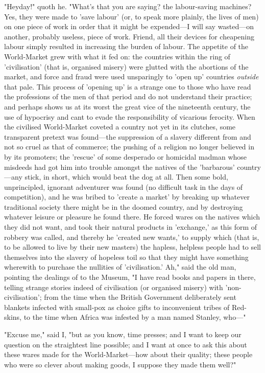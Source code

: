"Heyday!" quoth he. "What's that you are saying? the labour-saving
machines? Yes, they were made to 'save labour' (or, to speak more
plainly, the lives of men) on one piece of work in order that it might
be expended---I will say wasted---on another, probably useless, piece of
work. Friend, all their devices for cheapening labour simply resulted in
increasing the burden of labour. The appetite of the World-Market grew
with what it fed on: the countries within the ring of 'civilisation'
(that is, organised misery) were glutted with the abortions of the
market, and force and fraud were used unsparingly to 'open up' countries
\emph{outside} that pale. This process of 'opening up' is a strange one
to those who have read the professions of the men of that period and do
not understand their practice; and perhaps shows us at its worst the
great vice of the nineteenth century, the use of hypocrisy and cant to
evade the responsibility of vicarious ferocity. When the civilised
World-Market coveted a country not yet in its clutches, some transparent
pretext was found---the suppression of a slavery different from and not
so cruel as that of commerce; the pushing of a religion no longer
believed in by its promoters; the 'rescue' of some desperado or
homicidal madman whose misdeeds had got him into trouble amongst the
natives of the 'barbarous' country---any stick, in short, which would
beat the dog at all. Then some bold, unprincipled, ignorant adventurer
was found (no difficult task in the days of competition), and he was
bribed to 'create a market' by breaking up whatever traditional society
there might be in the doomed country, and by destroying whatever leisure
or pleasure he found there. He forced wares on the natives which they
did not want, and took their natural products in 'exchange,' as this
form of robbery was called, and thereby he 'created new wants,' to
supply which (that is, to be allowed to live by their new masters) the
hapless, helpless people had to sell themselves into the slavery of
hopeless toil so that they might have something wherewith to purchase
the nullities of 'civilisation.' Ah," said the old man, pointing the
dealings of to the Museum, "I have read books and papers in there,
telling strange stories indeed of civilisation (or organised misery)
with 'non-civilisation'; from the time when the British Government
deliberately sent blankets infected with small-pox as choice gifts to
inconvenient tribes of Red-skins, to the time when Africa was infested
by a man named Stanley, who---"

"Excuse me," said I, "but as you know, time presses; and I want to keep
our question on the straightest line possible; and I want at once to ask
this about these wares made for the World-Market---how about their
quality; these people who were so clever about making goods, I suppose
they made them well?"


